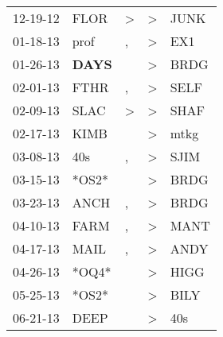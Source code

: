 \begin{supertabular}{p{0.07\textwidth}p{0.06\textwidth}p{0.02\textwidth}p{0.02\textwidth}p{0.06\textwidth}}
          12-19-12\textsuperscript{} &           FLOR\textsuperscript{} &     \textgreater &     \textgreater &           JUNK\textsuperscript{} \\
          01-18-13\textsuperscript{} &           prof\textsuperscript{} &                , &     \textgreater &            EX1\textsuperscript{} \\
          01-26-13\textsuperscript{} &  \textbf{DAYS\textsuperscript{}} &                  &     \textgreater &           BRDG\textsuperscript{} \\
          02-01-13\textsuperscript{} &           FTHR\textsuperscript{} &                , &     \textgreater &           SELF\textsuperscript{} \\
          02-09-13\textsuperscript{} &           SLAC\textsuperscript{} &     \textgreater &     \textgreater &           SHAF\textsuperscript{} \\
          02-17-13\textsuperscript{} &           KIMB\textsuperscript{} &                  &     \textgreater &           mtkg\textsuperscript{} \\
          03-08-13\textsuperscript{} &            40s\textsuperscript{} &                , &     \textgreater &           SJIM\textsuperscript{} \\
          03-15-13\textsuperscript{} &                            *OS2* &                  &     \textgreater &           BRDG\textsuperscript{} \\
          03-23-13\textsuperscript{} &           ANCH\textsuperscript{} &                , &     \textgreater &           BRDG\textsuperscript{} \\
          04-10-13\textsuperscript{} &           FARM\textsuperscript{} &                , &     \textgreater &           MANT\textsuperscript{} \\
          04-17-13\textsuperscript{} &           MAIL\textsuperscript{} &                , &     \textgreater &           ANDY\textsuperscript{} \\
          04-26-13\textsuperscript{} &                            *OQ4* &                  &     \textgreater &           HIGG\textsuperscript{} \\
          05-25-13\textsuperscript{} &                            *OS2* &                  &     \textgreater &           BILY\textsuperscript{} \\
          06-21-13\textsuperscript{} &           DEEP\textsuperscript{} &                  &     \textgreater &            40s\textsuperscript{} \\

\end{supertabular}
